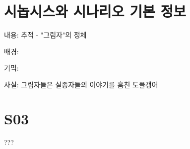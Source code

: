 \documentclass{report}
\begin{document}
	\section{시놉시스와 시나리오 기본 정보}
		내용: 추적 - "그림자"의 정체
		
		배경: 
		
		기믹: 
		
		사실: 그림자들은 실종자들의 이야기를 훔친 도플갱어
	
	\section{S03}
		???
\end{document}
